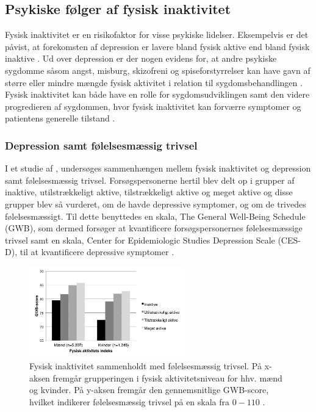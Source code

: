 \subsection{Psykiske følger af fysisk inaktivitet}
Fysisk inaktivitet er en risikofaktor for visse psykiske lidelser. Eksempelvis er det påvist, at forekomsten af depression er lavere bland fysisk aktive end bland fysisk inaktive \citep{motionsraad2007}. Ud over depression er der nogen evidens for, at andre psykiske sygdomme såsom angst, misburg, skizofreni og spiseforstyrrelser kan have gavn af større eller mindre mængde fysisk aktivitet i relation til sygdomsbehandlingen \citep{kessing2016}. Fysisk inaktivitet kan både have en rolle for sygdomsudviklingen samt den videre progredieren af sygdommen, hvor fysisk inaktivitet kan forværre symptomer og patientens generelle tilstand \citep{motionsraad2007,kessing2016}.

\subsubsection{Depression samt følelsesmæssig trivsel}
I et studie af \citeauthor{galper2006}, undersøges sammenhængen mellem fysisk inaktivitet og depression samt følelsesmæssig trivsel. Forsøgspersonerne hertil blev delt op i grupper af inaktive, utilstrækkeligt aktive, tilstrækkeligt aktive og meget aktive og disse grupper blev så vurderet, om de havde depressive symptomer, og om de trivedes følelsesmæssigt. 
Til dette benyttedes en skala, The General Well-Being Schedule (GWB), som dermed forsøger at kvantificere forsøgspersonernes følelsesmæssige trivsel samt en skala, Center for Epidemiologic Studies Depression Scale (CES-D), til at kvantificere depressive symptomer \citep{galper2006}.

\begin{figure}[H]
\centering
\includegraphics[width=0.6\textwidth]{figures/inaktivitet_gwb}
\caption{Fysisk inaktivitet sammenholdt med følelsesmæssig trivsel. På x-aksen fremgår grupperingen i fysisk aktivitetsniveau for hhv. mænd og kvinder. På y-aksen fremgår den gennemsnitlige GWB-score, hvilket indikerer følelsesmæssig trivsel på en skala fra $0-110$ \citep{galper2006}.}
\label{fig:inaktivitet_gwb}
\end{figure}


